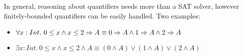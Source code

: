 \begin{mytitle} In general, reasoning about quantifiers needs more than a SAT solver, however finitely-bounded quantifiers can be easily handled. Two examples:
\begin{itemize}
    \item $\forall x: Int.\ 0 \le x \land x \le 2 \Rightarrow A \equiv 0 \Rightarrow A \land 1\Rightarrow A \land 2\Rightarrow A$
    \item $\exists x: Int.\ 0 \le x \land x \le 2 \land A \equiv (0 \land A) \lor (1\land A) \lor (2\land A)$
\end{itemize}
\end{mytitle}

